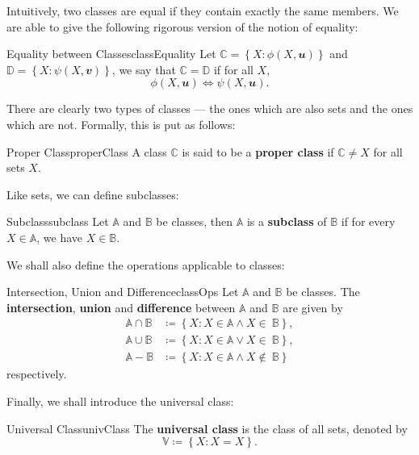 \documentclass[math]{amznotes}
\theoremstyle{remark}
\begin{document}
Intuitively, two classes are equal if they contain exactly the same members. We are able to give the following rigorous version of the notion of equality:
\begin{dfnbox}{Equality between Classes}{classEquality}
    Let $\mathbb{C} = \left\{X \colon \phi(X, \mathbfit{u})\right\}$ and $\mathbb{D} = \left\{X \colon \psi(X, \mathbfit{v})\right\}$, we say that $\mathbb{C} = \mathbb{D}$ if for all $X$,
    \begin{displaymath}
        \phi(X, \mathbfit{u}) \iff \psi(X, \mathbfit{u}).
    \end{displaymath}
\end{dfnbox}
There are clearly two types of classes --- the ones which are also sets and the ones which are not. Formally, this is put as follows:
\begin{dfnbox}{Proper Class}{properClass}
    A class $\mathbb{C}$ is said to be a {\color{red} \textbf{proper class}} if $\mathbb{C} \neq X$ for all sets $X$.
\end{dfnbox}
Like sets, we can define subclasses:
\begin{dfnbox}{Subclass}{subclass}
    Let $\mathbb{A}$ and $\mathbb{B}$ be classes, then $\mathbb{A}$ is a {\color{red} \textbf{subclass}} of $\mathbb{B}$ if for every $X \in \mathbb{A}$, we have $X \in \mathbb{B}$.
\end{dfnbox}
We shall also define the operations applicable to classes:
\begin{dfnbox}{Intersection, Union and Difference}{classOps}
    Let $\mathbb{A}$ and $\mathbb{B}$ be classes. The {\color{red} \textbf{intersection}}, {\color{red} \textbf{union}} and {\color{red} \textbf{difference}} between $\mathbb{A}$ and $\mathbb{B}$ are given by
    \begin{align*}
        \mathbb{A \cap B} & \coloneqq \left\{X \colon X \in \mathbb{A} \wedge X \in\ \mathbb{B}\right\}, \\
        \mathbb{A \cup B} & \coloneqq \left\{X \colon X \in \mathbb{A} \vee X \in\ \mathbb{B}\right\}, \\
        \mathbb{A - B} & \coloneqq \left\{X \colon X \in \mathbb{A} \wedge X \notin\ \mathbb{B}\right\}
    \end{align*}
    respectively.
\end{dfnbox}
Finally, we shall introduce the universal class:
\begin{dfnbox}{Universal Class}{univClass}
    The {\color{red} \textbf{universal class}} is the class of all sets, denoted by
    \begin{displaymath}
        \mathbb{V} \coloneqq \left\{X \colon X = X\right\}.
    \end{displaymath}
\end{dfnbox}
\end{document}
